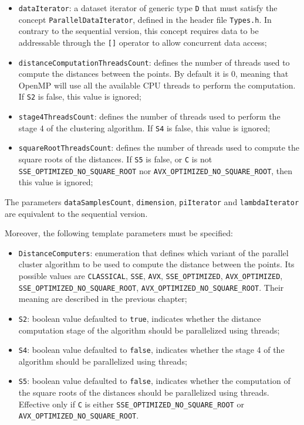 \documentclass{article}
\begin{document}
\begin{itemize}
\item
\texttt{dataIterator}: a dataset iterator of generic type \texttt{D}
that must satisfy the concept \texttt{ParallelDataIterator}, defined
in the header file \texttt{Types.h}. In contrary to the sequential
version, this concept requires data to be addressable through the
\texttt{{[}{]}} operator to allow concurrent data access;
\item
\texttt{distanceComputationThreadsCount}: defines the number of
threads used to compute the distances between the points. By default
it is \(0\), meaning that OpenMP will use all the available CPU
threads to perform the computation. If \texttt{S2} is false, this
value is ignored;
\item
\texttt{stage4ThreadsCount}: defines the number of threads used to
perform the stage 4 of the clustering algorithm. If \texttt{S4} is
false, this value is ignored;
\item
\texttt{squareRootThreadsCount}: defines the number of threads used to
compute the square roots of the distances. If \texttt{S5} is false, or
\texttt{C} is not \texttt{SSE\_OPTIMIZED\_NO\_SQUARE\_ROOT} nor
\texttt{AVX\_OPTIMIZED\_NO\_SQUARE\_ROOT}, then this value is ignored;
\end{itemize}

The parameters \texttt{dataSamplesCount}, \texttt{dimension},
\texttt{piIterator} and \texttt{lambdaIterator} are equivalent to the
sequential version.

Moreover, the following template parameters must be specified:

\begin{itemize}
\item
\texttt{DistanceComputers}: enumeration that defines which variant of
the parallel cluster algorithm to be used to compute the distance
between the points. Its possible values are \texttt{CLASSICAL},
\texttt{SSE}, \texttt{AVX}, \texttt{SSE\_OPTIMIZED},
\texttt{AVX\_OPTIMIZED}, \texttt{SSE\_OPTIMIZED\_NO\_SQUARE\_ROOT},
\texttt{AVX\_OPTIMIZED\_NO\_SQUARE\_ROOT}. Their meaning are described
in the previous chapter;
\item
\texttt{S2}: boolean value defaulted to \texttt{true}, indicates
whether the distance computation stage of the algorithm should be
parallelized using threads;
\item
\texttt{S4}: boolean value defaulted to \texttt{false}, indicates
whether the stage 4 of the algorithm should be parallelized using
threads;
\item
\texttt{S5}: boolean value defaulted to \texttt{false}, indicates
whether the computation of the square roots of the distances should be
parallelized using threads. Effective only if \texttt{C} is either
\texttt{SSE\_OPTIMIZED\_NO\_SQUARE\_ROOT} or
\texttt{AVX\_OPTIMIZED\_NO\_SQUARE\_ROOT}.
\end{itemize}
\end{document}
